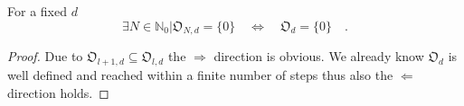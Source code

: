 
\begin{lemma}{}{}
	For a fixed $d$ 
	\begin{equation}
	\exists N \in \mathbb{N}_0 | \mathfrak{O}_{N,d}=\{0\} \quad \Leftrightarrow \quad 
	\mathfrak{O}_d = \{0\} \quad . 
	\end{equation}
\end{lemma}
\begin{proof}
	Due to $\mathfrak{O}_{l+1,d}\subseteq \mathfrak{O}_{l,d}$ the $\Rightarrow$ direction 
	is obvious. We already know $\mathfrak{O}_d$ is well defined and reached within a 
	finite number of steps thus also the $\Leftarrow$ direction holds.
\end{proof}


